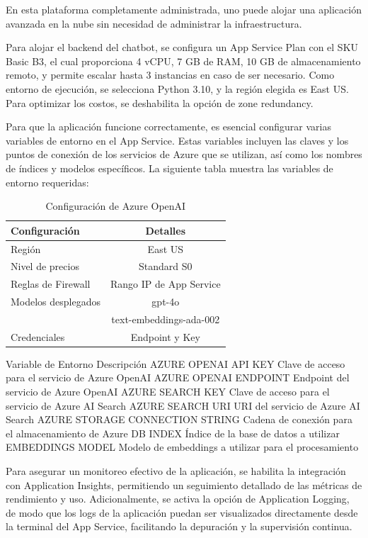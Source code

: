 En esta plataforma completamente administrada, uno puede alojar una aplicación avanzada en la nube sin necesidad de administrar la infraestructura.

Para alojar el backend del chatbot, se configura un App Service Plan con el SKU Basic B3, el cual proporciona 4 vCPU, 7 GB de RAM, 10 GB de almacenamiento remoto, y permite escalar hasta 3 instancias en caso de ser necesario. Como entorno de ejecución, se selecciona Python 3.10, y la región elegida es East US. Para optimizar los costos, se deshabilita la opción de zone redundancy.

Para que la aplicación funcione correctamente, es esencial configurar varias variables de entorno en el App Service. Estas variables incluyen las claves y los puntos de conexión de los servicios de Azure que se utilizan, así como los nombres de índices y modelos específicos. La siguiente tabla muestra las variables de entorno requeridas:

\begin{table}[h]
	\centering
	\caption[Configuración de Azure OpenAI]{Configuración de Azure OpenAI}
	\begin{tabular}{l c}    
		\toprule
		\textbf{Configuración} 	 & \textbf{Detalles} 	\\
		\midrule
		Región              &	East US 				        \\		
		Nivel de precios    & Standard S0				      \\
		Reglas de Firewall  & Rango IP de App Service \\
    Modelos desplegados	& gpt-4o				          \\
            	          & text-embeddings-ada-002	\\
    Credenciales	      & Endpoint y Key 		      \\
		\bottomrule
		\hline
	\end{tabular}
	\label{tab:config-openai}
\end{table}

Variable de Entorno	Descripción
AZURE OPENAI API KEY	Clave de acceso para el servicio de Azure OpenAI
AZURE OPENAI ENDPOINT	Endpoint del servicio de Azure OpenAI
AZURE SEARCH KEY	Clave de acceso para el servicio de Azure AI Search
AZURE SEARCH URI	URI del servicio de Azure AI Search
AZURE STORAGE CONNECTION STRING	Cadena de conexión para el almacenamiento de Azure
DB INDEX	Índice de la base de datos a utilizar
EMBEDDINGS MODEL	Modelo de embeddings a utilizar para el procesamiento

Para asegurar un monitoreo efectivo de la aplicación, se habilita la integración con Application Insights, permitiendo un seguimiento detallado de las métricas de rendimiento y uso. Adicionalmente, se activa la opción de Application Logging, de modo que los logs de la aplicación puedan ser visualizados directamente desde la terminal del App Service, facilitando la depuración y la supervisión continua.

